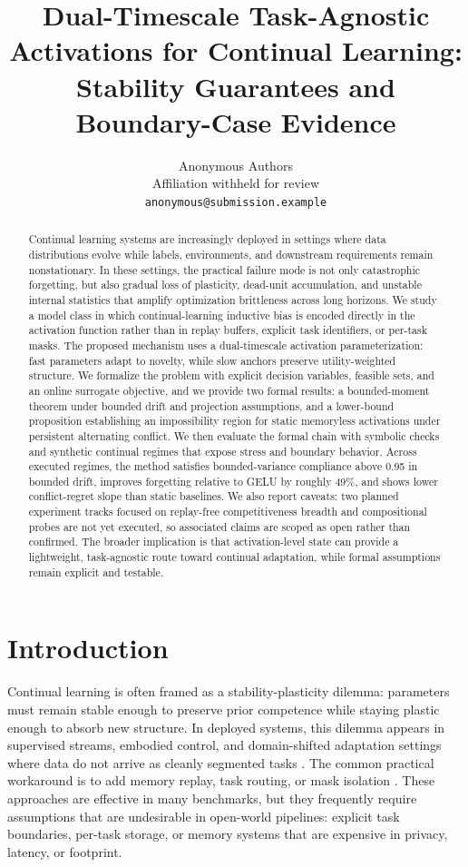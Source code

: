 \documentclass{article} %
\title{Dual-Timescale Task-Agnostic Activations for Continual Learning: \\ Stability Guarantees and Boundary-Case Evidence}
\author{Anonymous Authors \\
Affiliation withheld for review \\
\texttt{anonymous@submission.example}}
\begin{document}
\maketitle

\begin{abstract}
Continual learning systems are increasingly deployed in settings where data distributions evolve while labels, environments, and downstream requirements remain nonstationary. In these settings, the practical failure mode is not only catastrophic forgetting, but also gradual loss of plasticity, dead-unit accumulation, and unstable internal statistics that amplify optimization brittleness across long horizons. We study a model class in which continual-learning inductive bias is encoded directly in the activation function rather than in replay buffers, explicit task identifiers, or per-task masks. The proposed mechanism uses a dual-timescale activation parameterization: fast parameters adapt to novelty, while slow anchors preserve utility-weighted structure. We formalize the problem with explicit decision variables, feasible sets, and an online surrogate objective, and we provide two formal results: a bounded-moment theorem under bounded drift and projection assumptions, and a lower-bound proposition establishing an impossibility region for static memoryless activations under persistent alternating conflict. We then evaluate the formal chain with symbolic checks and synthetic continual regimes that expose stress and boundary behavior. Across executed regimes, the method satisfies bounded-variance compliance above 0.95 in bounded drift, improves forgetting relative to GELU by roughly 49\%, and shows lower conflict-regret slope than static baselines. We also report caveats: two planned experiment tracks focused on replay-free competitiveness breadth and compositional probes are not yet executed, so associated claims are scoped as open rather than confirmed. The broader implication is that activation-level state can provide a lightweight, task-agnostic route toward continual adaptation, while formal assumptions remain explicit and testable.
\end{abstract}

\section{Introduction}
Continual learning is often framed as a stability-plasticity dilemma: parameters must remain stable enough to preserve prior competence while staying plastic enough to absorb new structure. In deployed systems, this dilemma appears in supervised streams, embodied control, and domain-shifted adaptation settings where data do not arrive as cleanly segmented tasks \citep{s17,s18,s28,s30}. The common practical workaround is to add memory replay, task routing, or mask isolation \citep{s3,s4,s8,s9,s11,s14,s15}. These approaches are effective in many benchmarks, but they frequently require assumptions that are undesirable in open-world pipelines: explicit task boundaries, per-task storage, or memory systems that are expensive in privacy, latency, or footprint.
\end{document}
